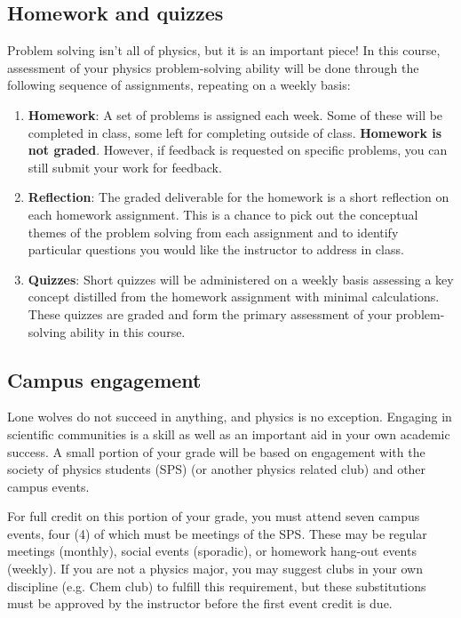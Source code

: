 \documentclass{syllabus}
\begin{document}
\subsection{Homework and quizzes}
Problem solving isn't all of physics, but it is an important piece! In this course, assessment of your physics problem-solving ability will be done through the following sequence of assignments, repeating on a weekly basis:
\begin{enumerate}
    \item \textbf{Homework}: A set of problems is assigned each week. Some of these will be completed in class, some left for completing outside of class. \textbf{Homework is not graded}. However, if feedback is requested on specific problems, you can still submit your work for feedback.
    \item \textbf{Reflection}: The graded deliverable for the homework is a short reflection on each homework assignment. This is a chance to pick out the conceptual themes of the problem solving from each assignment and to identify particular questions you would like the instructor to address in class. 
    \item \textbf{Quizzes}: Short quizzes will be administered on a weekly basis assessing a key concept distilled from the homework assignment with minimal calculations. These quizzes are graded and form the primary assessment of your problem-solving ability in this course.
\end{enumerate}

\subsection{Campus engagement}
Lone wolves do not succeed in anything, and physics is no exception. Engaging in scientific communities is a skill as well as an important aid in your own academic success. A small portion of your grade will be based on engagement with the society of physics students (SPS) (or another physics related club) and other campus events.

For full credit on this portion of your grade, you must attend seven campus events, four (4) of which must be meetings of the SPS. These may be regular meetings (monthly), social events (sporadic), or homework hang-out events (weekly). If you are not a physics major, you may suggest clubs in your own discipline (e.g. Chem club) to fulfill this requirement, but these substitutions must be approved by the instructor before the first event credit is due.
\end{document}
